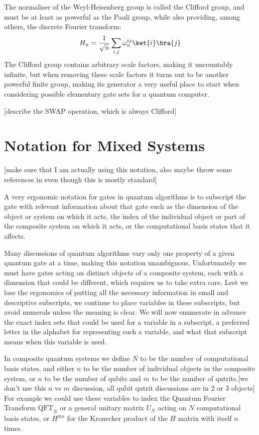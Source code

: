 The normaliser of the Weyl-Heisenberg group is called the Clifford group, and must be at least as powerful as the Pauli group, while also providing, among others, the discrete Fourier transform:
\[H_n = \frac{1}{\sqrt{n}}\sum_{i,j} \omega_n^{ij}\ket{i}\bra{j}\]
The Clifford group contains arbitrary scale factors, making it uncountably infinite, but when removing these scale factors it turns out to be another powerful finite group, making its generator a very useful place to start when considering possible elementary gate sets for a quantum computer.

[describe the SWAP operation, which is always Clifford]


\section{Notation for Mixed Systems}
[make sure that I am actually using this notation, also maybe throw some references in even though this is mostly standard]

A very ergonomic notation for gates in quantum algorithms is to subscript the gate with relevant information about that gate such as the dimension of the object or system on which it acts, the index of the individual object or part of the composite system on which it acts, or the computational basis states that it affects.

Many discussions of quantum algorithms vary only one property of a given quantum gate at a time, making this notation unambiguous. Unfortunately we must have gates acting on distinct objects of a composite system, each with a dimension that could be different, which requires us to take extra care. Lest we lose the ergonomics of putting all the necessary information in small and descriptive subscripts, we continue to place variables in these subscripts, but avoid numerals unless the meaning is clear. We will now enumerate in advance the exact index sets that could be used for a variable in a subscript, a preferred letter in the alphabet for representing such a variable, and what that subscript means when this variable is used.

In composite quantum systems we define $N$ to be the number of computational basis states, and either $n$ to be the number of individual objects in the composite system, or $n$ to be the number of qubits and $m$ to be the number of qutrits.[we don't use this $n$ vs $m$ discussion, all qubit qutrit discussions are in 2 or 3 objects] For example we could use these variables to index the Quantum Fourier Transform $\text{QFT}_N$ or a general unitary matrix $U_N$ acting on $N$ computational basis states, or $H^{\otimes n}$ for the Kronecker product of the $H$ matrix with itself $n$ times.

